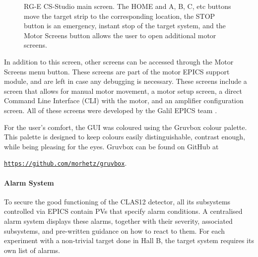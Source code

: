         \begin{figure}[t!]
            \centering{}
            \caption[RG-E CS-Studio main screen]{RG-E CS-Studio main screen. The HOME and A, B, C, etc buttons move the target strip to the corresponding location, the STOP button is an emergency, instant stop of the target system, and the Motor Screens button allows the user to open additional motor screens.}
            \label{fig::rge_motorx}
        \end{figure}

        In addition to this screen, other screens can be accessed through the Motor Screens menu button.
        These screens are part of the motor EPICS support module, and are left in case any debugging is necessary.
        These screens include a screen that allows for manual motor movement, a motor setup screen, a direct Command Line Interface (CLI) with the motor, and an amplifier configuration screen.
        All of these screens were developed by the Galil EPICS team \cite{farnswort2009}.

        For the user's comfort, the GUI was coloured using the Gruvbox colour palette.
        This palette is designed to keep colours easily distinguishable, contrast enough, while being pleasing for the eyes.
        Gruvbox can be found on GitHub at

        \begin{center}
            \hyperlink{https://github.com/morhetz/gruvbox}{\texttt{https://github.com/morhetz/gruvbox}}.
        \end{center}

    \paragraph{Alarm System}
        To secure the good functioning of the CLAS12 detector, all its subsystems controlled via EPICS contain PVs that specify alarm conditions.
        A centralised alarm system displays these alarms, together with their severity, associated subsystems, and pre-written guidance on how to react to them.
        For each experiment with a non-trivial target done in Hall B, the target system requires its own list of alarms.

